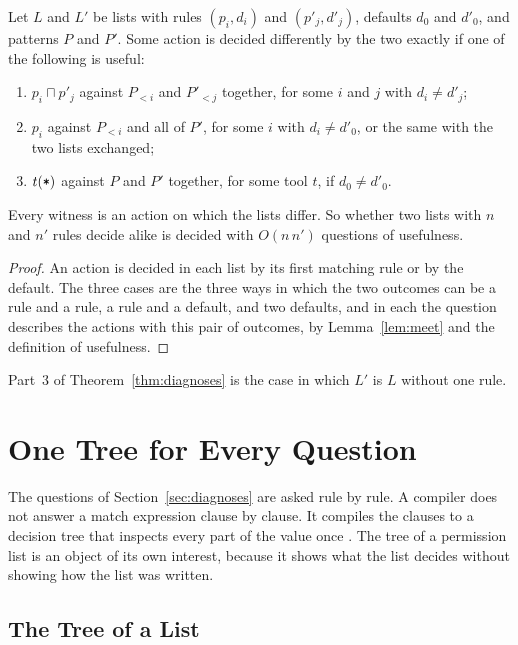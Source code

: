 \documentclass[acmsmall,nonacm,screen]{acmart}
\newcommand{\rest}{\textup{\texttt{*}}}
\newcommand{\meet}{\sqcap}
\begin{document}
\begin{theorem}[Equivalence]\label{thm:equivalence}
Let $L$ and $L'$ be lists with rules $(p_i, d_i)$ and $(p'_j, d'_j)$, defaults $d_0$ and
$d'_0$, and patterns $P$ and $P'$. Some action is decided differently by the two exactly if
one of the following is useful:
\begin{enumerate}
\item $p_i \meet p'_j$ against $P_{<i}$ and $P'_{<j}$ together, for some $i$ and $j$ with
  $d_i \ne d'_j$;
\item $p_i$ against $P_{<i}$ and all of $P'$, for some $i$ with $d_i \ne d'_0$, or the same
  with the two lists exchanged;
\item $t(\rest)$ against $P$ and $P'$ together, for some tool $t$, if $d_0 \ne d'_0$.
\end{enumerate}
Every witness is an action on which the lists differ. So whether two lists with $n$ and $n'$
rules decide alike is decided with $O(n\,n')$ questions of usefulness.
\end{theorem}

\begin{proof}
An action is decided in each list by its first matching rule or by the default. The three
cases are the three ways in which the two outcomes can be a rule and a rule, a rule and a
default, and two defaults, and in each the question describes the actions with this pair of
outcomes, by Lemma~\ref{lem:meet} and the definition of usefulness.
\end{proof}

Part~3 of Theorem~\ref{thm:diagnoses} is the case in which $L'$ is $L$ without one rule.

\section{One Tree for Every Question}\label{sec:tree}

The questions of Section~\ref{sec:diagnoses} are asked rule by rule. A compiler does not
answer a match expression clause by clause. It compiles the clauses to a decision tree that
inspects every part of the value once \citep{Augustsson1985,Maranget2008}. The tree of a
permission list is an object of its own interest, because it shows what the list decides
without showing how the list was written.

\subsection{The Tree of a List}
\end{document}
